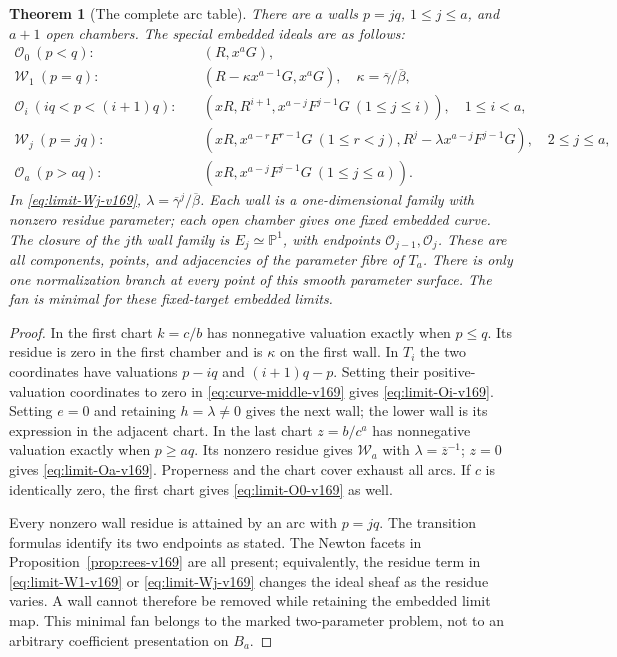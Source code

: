 \documentclass[11pt,reqno]{amsart}
\numberwithin{equation}{section}
\newtheorem{theorem}{Theorem}[section]
\theoremstyle{definition}\newtheorem{definition}[theorem]{Definition}
\theoremstyle{remark}\newtheorem{remark}[theorem]{Remark}
\newcommand{\Pj}{\mathbb P}\newcommand{\A}{\mathbb A}
\begin{document}
\begin{theorem}[The complete arc table]\label{thm:arc-table-v169}
There are $a$ walls $p=jq$, $1\leq j\leq a$, and $a+1$ open chambers.
The special embedded ideals are as follows:
\begin{align}
 \mathcal O_0\ (p<q):\quad& (R,x^aG),\label{eq:limit-O0-v169}\\
 \mathcal W_1\ (p=q):\quad&
       (R-\kappa x^{a-1}G,x^aG),\quad
       \kappa=\overline\gamma/\overline\beta,\label{eq:limit-W1-v169}\\
 \mathcal O_i\ (iq<p<(i+1)q):\quad&
       (xR,R^{i+1},x^{a-j}F^{j-1}G\ (1\leq j\leq i)),
       \quad1\leq i<a,\label{eq:limit-Oi-v169}\\
 \mathcal W_j\ (p=jq):\quad&
       (xR,x^{a-r}F^{r-1}G\ (1\leq r<j),
                   R^j-\lambda x^{a-j}F^{j-1}G),
       \quad2\leq j\leq a,\label{eq:limit-Wj-v169}\\
 \mathcal O_a\ (p>aq):\quad&
       (xR,x^{a-j}F^{j-1}G\ (1\leq j\leq a)).
       \label{eq:limit-Oa-v169}
\end{align}
In \eqref{eq:limit-Wj-v169}, $\lambda=\overline\gamma^j/\overline\beta$.
Each wall is a one-dimensional family with nonzero residue parameter;
each open chamber gives one fixed embedded curve. The closure of the
$j$th wall family is $E_j\simeq\Pj^1$, with endpoints
$\mathcal O_{j-1},\mathcal O_j$. These are all components, points, and
adjacencies of the parameter fibre of $T_a$. There is only one
normalization branch at every point of this smooth parameter surface.
The fan is minimal for these fixed-target embedded limits.
\end{theorem}
\begin{proof}
In the first chart $k=c/b$ has nonnegative valuation exactly when
$p\leq q$. Its residue is zero in the first chamber and is $\kappa$
on the first wall. In $T_i$ the two coordinates have valuations
$p-iq$ and $(i+1)q-p$. Setting their positive-valuation coordinates
to zero in \eqref{eq:curve-middle-v169} gives
\eqref{eq:limit-Oi-v169}. Setting $e=0$ and retaining
$h=\lambda\ne0$ gives the next wall; the lower wall is its expression
in the adjacent chart. In the last chart $z=b/c^a$ has nonnegative
valuation exactly when $p\geq aq$. Its nonzero residue gives
$\mathcal W_a$ with $\lambda=\overline z^{-1}$; $z=0$ gives
\eqref{eq:limit-Oa-v169}. Properness and the chart cover exhaust all
arcs. If $c$ is identically zero, the first chart gives
\eqref{eq:limit-O0-v169} as well.

Every nonzero wall residue is attained by an arc with $p=jq$.
The transition formulas identify its two endpoints as stated. The
Newton facets in Proposition~\ref{prop:rees-v169} are all present;
equivalently, the residue term in \eqref{eq:limit-W1-v169} or
\eqref{eq:limit-Wj-v169} changes the ideal sheaf as the residue varies.
A wall cannot therefore be removed while retaining the embedded limit
map. This minimal fan belongs to the marked two-parameter problem,
not to an arbitrary coefficient presentation on $B_a$.
\end{proof}
\end{document}
